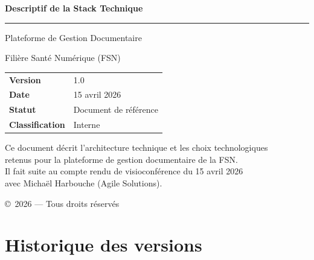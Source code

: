 \documentclass[a4paper,12pt,french]{article}
\begin{document}
\begin{titlepage}
\begin{center}

\vspace*{2cm}

{\LARGE\bfseries\textcolor{darkbg}{Descriptif de la Stack Technique}}

\vspace{0.5cm}

{\Large\textcolor{accentgreen}{\rule{4cm}{2pt}}}

\vspace{1cm}

{\Large\textcolor{maintext}{Plateforme de Gestion Documentaire}}

{\Large\textcolor{maintext}{Filière Santé Numérique (FSN)}}

\vspace{2cm}

\begin{tabular}{ll}
\textbf{Version}        & 1.0 \\
\textbf{Date}           & 15 avril 2026 \\
\textbf{Statut}         & Document de référence \\
\textbf{Classification} & Interne \\
\end{tabular}

\vspace{2cm}

{\small\textcolor{maintext}{
Ce document décrit l'architecture technique et les choix technologiques\\
retenus pour la plateforme de gestion documentaire de la FSN.\\[0.5em]
Il fait suite au compte rendu de visioconférence du 15 avril 2026\\
avec Michaël Harbouche (Agile Solutions).
}}

\vfill

{\footnotesize\textcolor{maintext}{\copyright\ 2026 — Tous droits réservés}}

\end{center}
\end{titlepage}

\newpage
\section*{Historique des versions}
\end{document}
